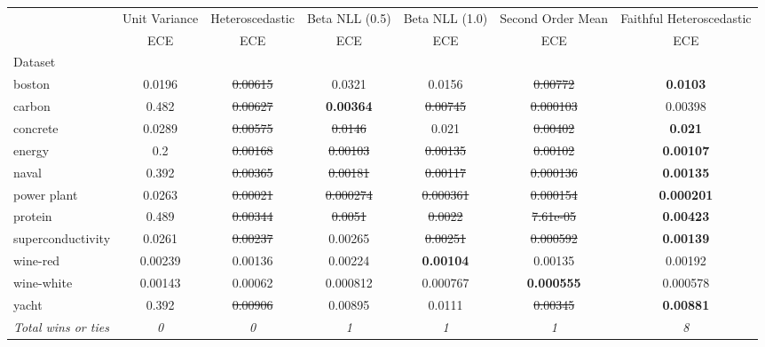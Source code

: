\begin{tabular}{l|c|c|c|c|c|c}
\toprule
{} & {Unit Variance} & {Heteroscedastic} & {Beta NLL (0.5)} & {Beta NLL (1.0)} & {Second Order Mean} & {Faithful Heteroscedastic} \\
{} & {ECE} & {ECE} & {ECE} & {ECE} & {ECE} & {ECE} \\
{Dataset} & {} & {} & {} & {} & {} & {} \\
\midrule
boston & 0.0196 & \sout{0.00615} & 0.0321 & 0.0156 & \sout{0.00772} & \textbf{0.0103} \\
carbon & 0.482 & \sout{0.00627} & \textbf{0.00364} & \sout{0.00745} & \sout{0.000103} & 0.00398 \\
concrete & 0.0289 & \sout{0.00575} & \sout{0.0146} & 0.021 & \sout{0.00402} & \textbf{0.021} \\
energy & 0.2 & \sout{0.00168} & \sout{0.00103} & \sout{0.00135} & \sout{0.00102} & \textbf{0.00107} \\
naval & 0.392 & \sout{0.00365} & \sout{0.00181} & \sout{0.00117} & \sout{0.000136} & \textbf{0.00135} \\
power plant & 0.0263 & \sout{0.00021} & \sout{0.000274} & \sout{0.000361} & \sout{0.000154} & \textbf{0.000201} \\
protein & 0.489 & \sout{0.00344} & \sout{0.0051} & \sout{0.0022} & \sout{7.61e-05} & \textbf{0.00423} \\
superconductivity & 0.0261 & \sout{0.00237} & 0.00265 & \sout{0.00251} & \sout{0.000592} & \textbf{0.00139} \\
wine-red & 0.00239 & 0.00136 & 0.00224 & \textbf{0.00104} & 0.00135 & 0.00192 \\
wine-white & 0.00143 & 0.00062 & 0.000812 & 0.000767 & \textbf{0.000555} & 0.000578 \\
yacht & 0.392 & \sout{0.00906} & 0.00895 & 0.0111 & \sout{0.00345} & \textbf{0.00881} \\
\textit{{Total wins or ties}} & \textit{0} & \textit{0} & \textit{1} & \textit{1} & \textit{1} & \textit{8} \\
\bottomrule
\end{tabular}
